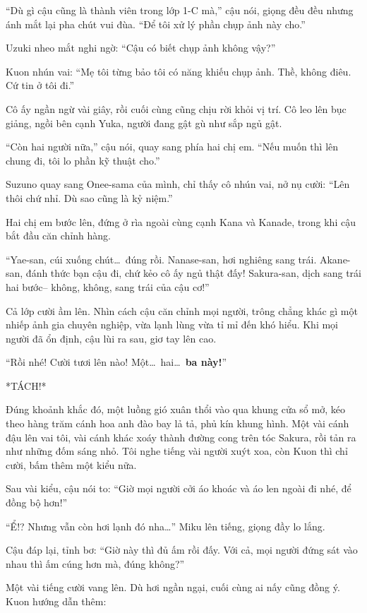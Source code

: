 \documentclass[../main.tex]{subfiles}
\begin{document}
``Dù gì cậu cũng là thành viên trong lớp 1-C mà,'' cậu nói, giọng đều đều nhưng ánh mắt lại pha chút vui đùa. ``Để tôi xử lý phần chụp ảnh này cho.''

Uzuki nheo mắt nghi ngờ: ``Cậu có biết chụp ảnh không vậy?''

Kuon nhún vai: ``Mẹ tôi từng bảo tôi có năng khiếu chụp ảnh. Thề, không điêu. Cứ tin ở tôi đi.''

Cô ấy ngần ngừ vài giây, rồi cuối cùng cũng chịu rời khỏi vị trí. Cô leo lên bục giảng, ngồi bên cạnh Yuka, người đang gật gù như sắp ngủ gật.

``Còn hai người nữa,'' cậu nói, quay sang phía hai chị em. ``Nếu muốn thì lên chung đi, tôi lo phần kỹ thuật cho.''

Suzuno quay sang Onee-sama của mình, chỉ thấy cô nhún vai, nở nụ cười: ``Lên thôi chứ nhỉ. Dù sao cũng là kỷ niệm.''

Hai chị em bước lên, đứng ở rìa ngoài cùng cạnh Kana và Kanade, trong khi cậu bắt đầu căn chỉnh hàng.

``Yae-san, cúi xuống chút\dots\ đúng rồi. Nanase-san, hơi nghiêng sang trái. Akane-san, đánh thức bạn cậu đi, chứ kẻo cô ấy ngủ thật đấy! Sakura-san, dịch sang trái hai bước-- không, không, sang trái của cậu cơ!''

Cả lớp cười ầm lên. Nhìn cách cậu căn chỉnh mọi người, trông chẳng khác gì một nhiếp ảnh gia chuyên nghiệp, vừa lạnh lùng vừa tỉ mỉ đến khó hiểu. Khi mọi người đã ổn định, cậu lùi ra sau, giơ tay lên cao.

``Rồi nhé! Cười tươi lên nào! Một\dots\ hai\dots\ \textbf{ba này!}''

*TÁCH!*

Đúng khoảnh khắc đó, một luồng gió xuân thổi vào qua khung cửa sổ mở, kéo theo hàng trăm cánh hoa anh đào bay lả tả, phủ kín khung hình. Một vài cánh đậu lên vai tôi, vài cánh khác xoáy thành đường cong trên tóc Sakura, rồi tản ra như những đốm sáng nhỏ. Tôi nghe tiếng vài người xuýt xoa, còn Kuon thì chỉ cười, bấm thêm một kiểu nữa.

Sau vài kiểu, cậu nói to: ``Giờ mọi người cởi áo khoác và áo len ngoài đi nhé, để đồng bộ hơn!''

``Ể!? Nhưng vẫn còn hơi lạnh đó nha\dots'' Miku lên tiếng, giọng đầy lo lắng.

Cậu đáp lại, tỉnh bơ: ``Giờ này thì đủ ấm rồi đấy. Với cả, mọi người đứng sát vào nhau thì ấm cúng hơn mà, đúng không?''

Một vài tiếng cười vang lên. Dù hơi ngần ngại, cuối cùng ai nấy cũng đồng ý. Kuon hướng dẫn thêm:
\end{document}
